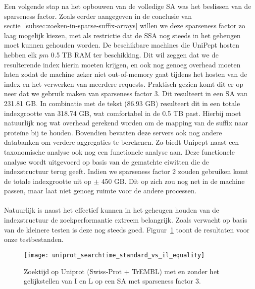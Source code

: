 Een volgende stap na het opbouwen van de volledige SA was het beslissen van de sparseness factor.
Zoals eerder aangegeven in de conclusie van sectie~\ref{subsec:zoeken-in-sparse-suffix-arrays} willen we deze sparseness factor zo laag mogelijk kiezen, met als restrictie dat de SSA nog steeds in het geheugen moet kunnen gehouden worden.
De beschikbare machines die UniPept hosten hebben elk $pm$ 0.5 TB RAM ter beschikking.
Dit wil zeggen dat we de resulterende index hierin moeten krijgen, en ook nog genoeg overhead moeten laten zodat de machine zeker niet out-of-memory gaat tijdens het hosten van de index en het verwerken van meerdere requests.
Praktisch gezien komt dit er op neer dat we gebruik maken van sparseness factor 3.
Dit resulteert in een SA van 231.81 GB\@.
In combinatie met de tekst (86.93 GB) resulteert dit in een totale indexgrootte van 318.74 GB, wat comfortabel in de 0.5 TB past.
Hierbij moet natuurlijk nog wat overhead gerekend worden om de mapping van de suffix naar proteïne bij te houden.
Bovendien bevatten deze servers ook nog andere databanken om verdere aggregaties te berekenen.
Zo biedt Unipept naast een taxonomische analyse ook nog een functionele analyse aan.
Deze functionele analyse wordt uitgevoerd op basis van de gematchte eiwitten die de indexstructuur terug geeft.
Indien we sparseness factor 2 zouden gebruiken komt de totale indexgrootte uit op $\pm$ 450 GB\@.
Dit op zich zou nog net in de machine passen, maar laat niet genoeg ruimte voor de andere processen.
\\ \\
Natuurlijk is naast het effectief kunnen in het geheugen houden van de indexstructuur de zoekperformantie extreem belangrijk.
Zoals verwacht op basis van de kleinere testen is deze nog steeds goed.
Figuur~\ref{fig:uniprot_search} toont de resultaten voor onze testbestanden.

\begin{figure}[ht]
    \centering
    \texttt{[image: uniprot\_searchtime\_standard\_vs\_il\_equality]}
    \caption{Zoektijd op Uniprot (Swiss-Prot + TrEMBL) met en zonder het gelijkstellen van I en L op een SA met sparseness factor 3.}
    \label{fig:uniprot_search}
\end{figure}

